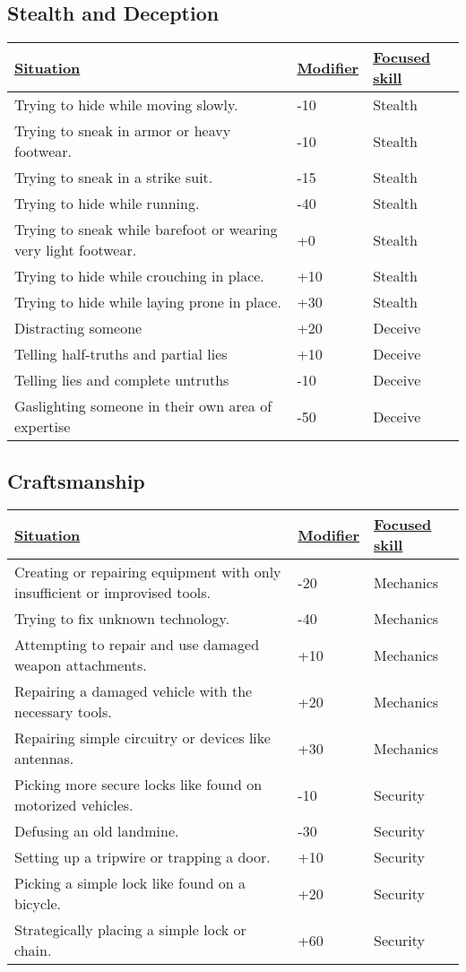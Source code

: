 \subsection{Stealth and Deception}
\begin{tabularx}{\textwidth}{|X|l|l|}
	\hline
	\ul{Situation} & \ul{Modifier} & \ul{Focused skill} \\ \hline
	Trying to hide while moving slowly. & -10 & Stealth \\ \hline
	Trying to sneak in armor or heavy footwear. & -10 & Stealth \\ \hline
	Trying to sneak in a strike suit. & -15 & Stealth \\ \hline
	Trying to hide while running. & -40 & Stealth \\ \hline
	Trying to sneak while barefoot or wearing very light footwear. & +0 & Stealth \\ \hline
	Trying to hide while crouching in place. & +10 & Stealth \\ \hline
	Trying to hide while laying prone in place. & +30 & Stealth \\ \hline
	Distracting someone & +20 & Deceive \\ \hline
	Telling half-truths and partial lies & +10 & Deceive \\ \hline
	Telling lies and complete untruths & -10 & Deceive \\ \hline
	Gaslighting someone in their own area of expertise & -50 & Deceive \\ \hline
\end{tabularx}

\subsection{Craftsmanship}
\begin{tabularx}{\textwidth}{|X|l|l|}
	\hline
	\ul{Situation} & \ul{Modifier} & \ul{Focused skill} \\ \hline
	Creating or repairing equipment with only insufficient or improvised tools. & -20 & Mechanics \\ \hline
	Trying to fix unknown technology. & -40 & Mechanics \\ \hline
	Attempting to repair and use damaged weapon attachments. & +10 & Mechanics \\ \hline
	Repairing a damaged vehicle with the necessary tools. & +20 & Mechanics \\ \hline
	Repairing simple circuitry or devices like antennas. & +30 & Mechanics \\ \hline
	Picking more secure locks like found on motorized vehicles. & -10 & Security \\ \hline
	Defusing an old landmine. & -30 & Security \\ \hline
	Setting up a tripwire or trapping a door. & +10 & Security \\ \hline
	Picking a simple lock like found on a bicycle. & +20 & Security \\ \hline
	Strategically placing a simple lock or chain. & +60 & Security \\ \hline
\end{tabularx}
